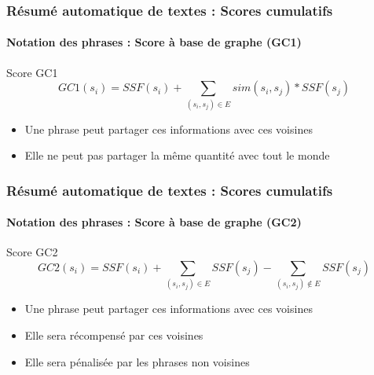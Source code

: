 \documentclass[xcolor=table]{beamer}
\begin{document}
\begin{frame}
\frametitle{Résumé automatique de textes : Scores cumulatifs}
\framesubtitle{Notation des phrases : Score à base de graphe (GC1)}

\begin{block}{Score GC1}
	\[GC1(s_i) = SSF(s_i) + \sum\limits_{(s_i, s_j) \in E} sim(s_i, s_j) * SSF(s_j)\]
\end{block}
\begin{itemize}
	\item Une phrase peut partager ces informations avec ces voisines
	\item Elle ne peut pas partager la même quantité avec tout le monde 
\end{itemize}
%		
%		
	
\end{frame}

\begin{frame}
\frametitle{Résumé automatique de textes : Scores cumulatifs}
\framesubtitle{Notation des phrases : Score à base de graphe (GC2)}

\begin{block}{Score GC2}
	\[GC2(s_i) = SSF(s_i) + \sum\limits_{(s_i, s_j) \in E} SSF(s_j) - \sum\limits_{(s_i, s_j) \notin E} SSF(s_j)\]
\end{block}
\begin{itemize}
	\item Une phrase peut partager ces informations avec ces voisines
	\item Elle sera récompensé par ces voisines
	\item Elle sera pénalisée par les phrases non voisines  
\end{itemize}
%		
%		
	
\end{frame}
\end{document}
